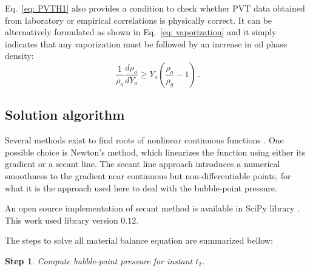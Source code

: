 \documentclass[final,authoryear,5p,times,twocolumn,10pt]{elsarticle}
\newtheorem{step}{Step}
\begin{document}
Eq.~\eqref{eq: PVTH1} also provides a condition to check whether PVT data obtained from laboratory or empirical correlations is physically correct. It can be alternatively formulated as shown in Eq.~\eqref{eq: vaporization} and it simply indicates that any vaporization must be followed by an increase in oil phase density:
\begin{equation}\label{eq: vaporization}
\frac{1}{\rho_o}\frac{d\rho_o}{dY_o} \geq Y_o \left( \frac{\rho_o}{\rho_g} - 1 \right) \, .
\end{equation}



\subsection{Solution algorithm}
Several methods exist to find roots of nonlinear continuous functions \citep{hamming1987numerical}. One possible choice is Newton's method, which linearizes the function using either its gradient or a secant line. The secant line approach introduces a numerical smoothness to the gradient near continuous but non-differentiable points, for what it is the approach used here to deal with the bubble-point pressure.

An open source implementation of secant method is available in SciPy library \citep{scipy}. This work used library version $0.12$.




The steps to solve all material balance equation are summarized bellow:
\begin{step}
Compute bubble-point pressure for instant $t_2$.
\end{step}
\end{document}
